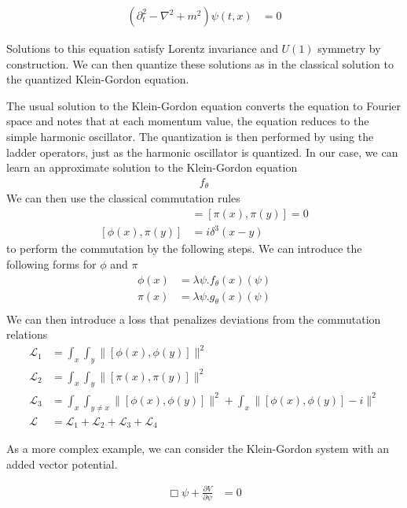 \documentclass[book.tex]{subfiles}
\begin{document}
\begin{align}
(\partial_t^2 - \nabla^2 + m^2)\psi(t, x) &= 0
\end{align}

Solutions to this equation satisfy Lorentz invariance and $U(1)$ symmetry by construction. We can then quantize these solutions as in the classical solution to the quantized Klein-Gordon equation.

The usual solution to the Klein-Gordon equation converts the equation to Fourier space and notes that at each momentum value, the equation reduces to the simple harmonic oscillator. The quantization is then performed by using the ladder operators, just as the harmonic oscillator is quantized. In our case,  we can learn an approximate solution to the Klein-Gordon equation
\begin{align}
f_\theta
\end{align}
We can then use the classical commutation rules
\begin{align}
[\phi(x), \phi(y)] &= [\pi(x), \pi(y)] = 0 \\
[\phi(x), \pi(y)] &= i \delta^3(x-y)
\end{align}
to perform the commutation by the following steps. We can introduce the following forms for $\phi$ and $\pi$
\begin{align}
\phi(x) &= \lambda \psi. f_\theta(x)(\psi) \\
\pi(x) &= \lambda \psi. g_\theta(x)(\psi) \\
\end{align}
We can then introduce a loss that penalizes deviations from the commutation relations
\begin{align}
\mathcal{L}_1 &= \int_x \int_y \|[\phi(x), \phi(y)]\|^2 \\
\mathcal{L}_2 &= \int_x \int_y \|[\pi(x), \pi(y)]\|^2 \\
\mathcal{L}_3 &= \int_x \int_{y \neq x} \|[\phi(x), \phi(y)]\|^2 + \int_x \|[\phi(x), \phi(y)] - i\|^2\\
\mathcal{L} &= \mathcal{L}_1 + \mathcal{L}_2 + \mathcal{L}_3 + \mathcal{L}_4
\end{align}




As a more complex example, we can consider the Klein-Gordon system with an added vector potential.

\begin{align}
\Box \psi + \frac{\partial V}{\partial \psi} &= 0
\end{align}
\end{document}
